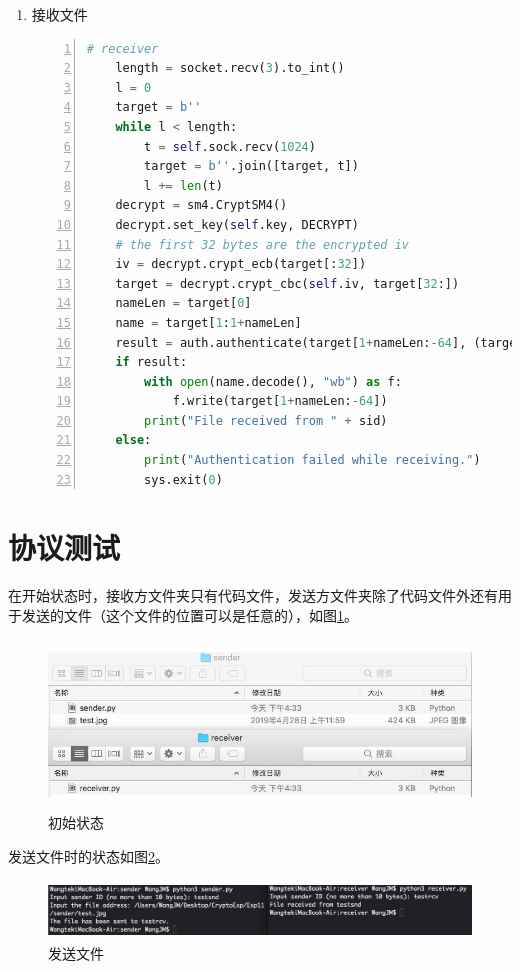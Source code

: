 \documentclass[11pt]{ctexart}
\begin{document}
\begin{enumerate}
    \item 接收文件

    \begin{lstlisting}[language={python},
    numbers=left,
    numberstyle=\tiny\monaco,
    basicstyle=\small\monaco]
    # receiver
    length = socket.recv(3).to_int()
    l = 0
    target = b''
    while l < length:
        t = self.sock.recv(1024)
        target = b''.join([target, t])
        l += len(t)
    decrypt = sm4.CryptSM4()
    decrypt.set_key(self.key, DECRYPT)
    # the first 32 bytes are the encrypted iv
    iv = decrypt.crypt_ecb(target[:32])
    target = decrypt.crypt_cbc(self.iv, target[32:])
    nameLen = target[0]
    name = target[1:1+nameLen]
    result = auth.authenticate(target[1+nameLen:-64], (target[-64:-32], target[-32:]))
    if result:
        with open(name.decode(), "wb") as f:
            f.write(target[1+nameLen:-64])
        print("File received from " + sid)
    else:
        print("Authentication failed while receiving.")
        sys.exit(0)
    \end{lstlisting}
\end{enumerate}
\section{协议测试} %
\label{sec:协议测试}
在开始状态时，接收方文件夹只有代码文件，发送方文件夹除了代码文件外还有用于发送的文件（这个文件的位置可以是任意的），如图\ref{img_init}。

\begin{figure}[htbp]
\centering
\includegraphics[width=13.06cm, height=4.48cm]{init.jpg}
\caption{初始状态}
\label{img_init}
\end{figure}

发送文件时的状态如图\ref{img_send}。

\begin{figure}[htbp]
\centering
\includegraphics[width=13.27cm, height=1.55cm]{process.jpg}
\caption{发送文件}
\label{img_send}
\end{figure}
\end{document}

